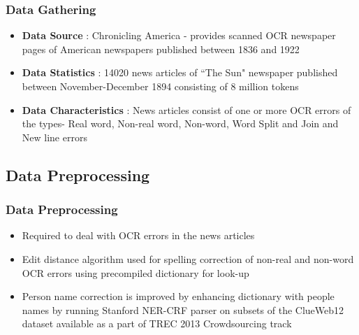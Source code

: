 \documentclass{beamer}
\begin{document}
\begin{frame}

\frametitle{Data Gathering}
\begin{itemize}
\item \textbf{Data Source} : Chronicling America - provides scanned OCR newspaper pages of American newspapers published between 1836 and 1922 
\item \textbf{Data Statistics} : 14020 news articles of ``The Sun" newspaper published between November-December 1894 consisting of 8 million tokens
\item \textbf{Data Characteristics} : News articles consist of one or more OCR errors of the types- Real word, Non-real word, Non-word, Word Split and Join and New line errors
\end{itemize}
\end{frame} 

\subsection{Data Preprocessing}

\begin{frame}
\frametitle{Data Preprocessing}
\begin{itemize}
\item
Required to deal with OCR errors in the news articles
\item
Edit distance algorithm used for spelling correction of non-real and non-word OCR errors using precompiled dictionary for look-up
\item
Person name correction is improved by enhancing dictionary with people names by running Stanford NER-CRF parser on subsets of the ClueWeb12 dataset available as a part of TREC 2013 Crowdsourcing track
\end{itemize}
\end{frame}
\end{document}
